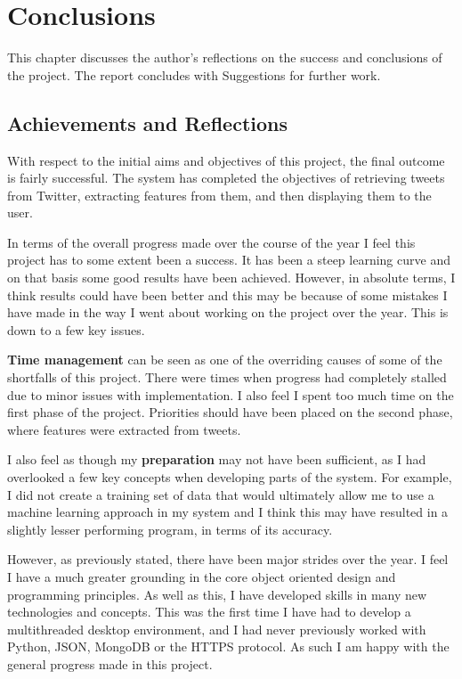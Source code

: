 \chapter{Conclusions}
\label{cha:conclusion}
This chapter discusses the author's reflections on the success and conclusions of the project. The report concludes with Suggestions for further work.

\section{Achievements and Reflections}
With respect to the initial aims and objectives of this project, the final outcome is fairly successful. The system has completed the objectives of retrieving tweets from Twitter, extracting features from them, and then displaying them to the user.

In terms of the overall progress made over the course of the year I feel this project has to some extent been a success. It has been a steep learning curve and on that basis some good results have been achieved. However, in absolute terms, I think results could have been better and this may be because of some mistakes I have made in the way I went about working on the project over the year. This is down to a few key issues.

\textbf{Time management} can be seen as one of the overriding causes of some of the shortfalls of this project. There were times when progress had completely stalled due to minor issues with implementation. I also feel I spent too much time on the first phase of the project. Priorities should have been placed on the second phase, where features were extracted from tweets.

I also feel as though my \textbf{preparation} may not have been sufficient, as I had overlooked a few key concepts when developing parts of the system. For example, I did not create a training set of data that would ultimately allow me to use a machine learning approach in my system and I think this may have resulted in a slightly lesser performing program, in terms of its accuracy.

However, as previously stated, there have been major strides over the year. I feel I have a much greater grounding in the core object oriented design and programming principles. As well as this, I have developed skills in many new technologies and concepts. This was the first time I have had to develop a multithreaded desktop environment, and I had never previously worked with Python, JSON, MongoDB or the HTTPS protocol. As such I am happy with the general progress made in this project.


